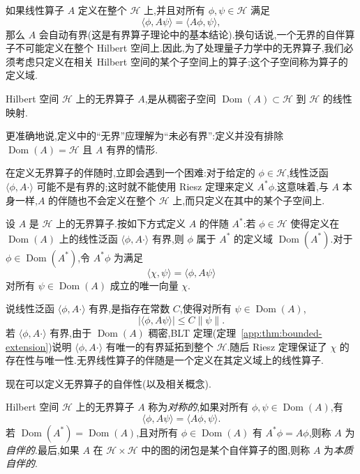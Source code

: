 如果线性算子 \(A\) 定义在整个 \(\mathcal{H}\) 上,并且对所有 \(\phi,\psi\in\mathcal{H}\) 满足
\[
\langle\phi,A\psi\rangle=\langle A\phi,\psi\rangle,
\]
那么 \(A\) 会自动有界(这是有界算子理论中的基本结论).换句话说,一个无界的自伴算子不可能定义在整个 Hilbert 空间上.因此,为了处理量子力学中的无界算子,我们必须考虑只定义在相关 Hilbert 空间的某个子空间上的算子;这个子空间称为算子的定义域.

\begin{definition}[无界算子]\label{def:unbounded-operator}
Hilbert 空间 \(\mathcal{H}\) 上的无界算子 \(A\),是从稠密子空间 \(\operatorname{Dom}(A)\subset\mathcal{H}\) 到 \(\mathcal{H}\) 的线性映射.
\end{definition}

更准确地说,定义中的“无界”应理解为“未必有界”:定义并没有排除 \(\operatorname{Dom}(A)=\mathcal{H}\) 且 \(A\) 有界的情形.

在定义无界算子的伴随时,立即会遇到一个困难:对于给定的 \(\phi\in\mathcal{H}\),线性泛函 \(\langle\phi,A\mathord{\cdot}\rangle\) 可能不是有界的;这时就不能使用 Riesz 定理来定义 \(A^{*}\phi\).这意味着,与 \(A\) 本身一样,\(A\) 的伴随也不会定义在整个 \(\mathcal{H}\) 上,而只定义在其中的某个子空间上.

\begin{definition}[无界算子的伴随]\label{def:unbounded-adjoint}
设 \(A\) 是 \(\mathcal{H}\) 上的无界算子.按如下方式定义 \(A\) 的伴随 \(A^{*}\):若 \(\phi\in\mathcal{H}\) 使得定义在 \(\operatorname{Dom}(A)\) 上的线性泛函 \(\langle\phi,A\mathord{\cdot}\rangle\) 有界,则 \(\phi\) 属于 \(A^{*}\) 的定义域 \(\operatorname{Dom}(A^{*})\).对于 \(\phi\in\operatorname{Dom}(A^{*})\),令 \(A^{*}\phi\) 为满足
\[
\langle\chi,\psi\rangle=\langle\phi,A\psi\rangle
\]
对所有 \(\psi\in\operatorname{Dom}(A)\) 成立的唯一向量 \(\chi\).
\end{definition}

说线性泛函 \(\langle\phi,A\mathord{\cdot}\rangle\) 有界,是指存在常数 \(C\),使得对所有 \(\psi\in\operatorname{Dom}(A)\),
\[
|\langle\phi,A\psi\rangle|\le C\|\psi\|.
\]
若 \(\langle\phi,A\mathord{\cdot}\rangle\) 有界,由于 \(\operatorname{Dom}(A)\) 稠密,BLT 定理(定理~\ref{app:thm:bounded-extension})说明 \(\langle\phi,A\mathord{\cdot}\rangle\) 有唯一的有界延拓到整个 \(\mathcal{H}\).随后 Riesz 定理保证了 \(\chi\) 的存在性与唯一性.无界线性算子的伴随是一个定义在其定义域上的线性算子.

现在可以定义无界算子的自伴性(以及相关概念).

\begin{definition}[对称、自伴与本质自伴]\label{def:symmetric-self-adjoint}
Hilbert 空间 \(\mathcal{H}\) 上的无界算子 \(A\) 称为\emph{对称的},如果对所有 \(\phi,\psi\in\operatorname{Dom}(A)\),有
\[
\langle\phi,A\psi\rangle=\langle A\phi,\psi\rangle.
\]
若 \(\operatorname{Dom}(A^{*})=\operatorname{Dom}(A)\),且对所有 \(\phi\in\operatorname{Dom}(A)\) 有 \(A^{*}\phi=A\phi\),则称 \(A\) 为\emph{自伴的}.最后,如果 \(A\) 在 \(\mathcal{H}\times\mathcal{H}\) 中的图的闭包是某个自伴算子的图,则称 \(A\) 为\emph{本质自伴的}.
\end{definition}

